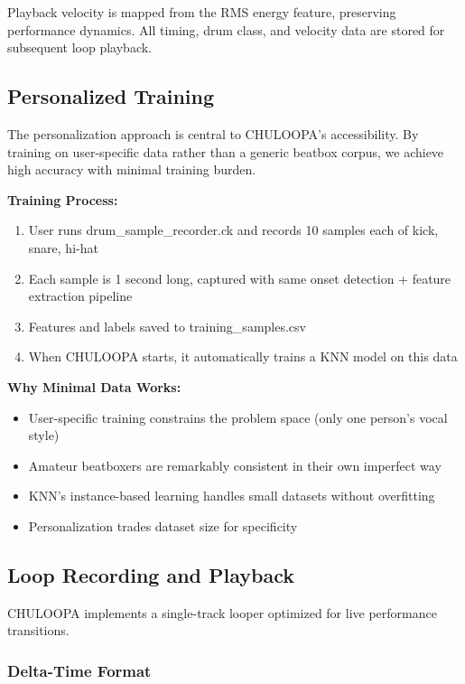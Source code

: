 \documentclass{aimc2026}
\begin{document}
Playback velocity is mapped from the RMS energy feature, preserving performance dynamics. All timing, drum class, and velocity data are stored for subsequent loop playback.

\subsection{Personalized Training}

The personalization approach is central to CHULOOPA's accessibility. By training on user-specific data rather than a generic beatbox corpus, we achieve high accuracy with minimal training burden.

\textbf{Training Process:}
\begin{enumerate}
\item User runs drum\_sample\_recorder.ck and records 10 samples each of kick, snare, hi-hat
\item Each sample is 1 second long, captured with same onset detection + feature extraction pipeline
\item Features and labels saved to training\_samples.csv
\item When CHULOOPA starts, it automatically trains a KNN model on this data
\end{enumerate}

\textbf{Why Minimal Data Works:}
\begin{itemize}
\item User-specific training constrains the problem space (only one person's vocal style)
\item Amateur beatboxers are remarkably consistent in their own imperfect way
\item KNN's instance-based learning handles small datasets without overfitting
\item Personalization trades dataset size for specificity
\end{itemize}

\subsection{Loop Recording and Playback}

CHULOOPA implements a single-track looper optimized for live performance transitions.

\subsubsection{Delta-Time Format}
\end{document}
